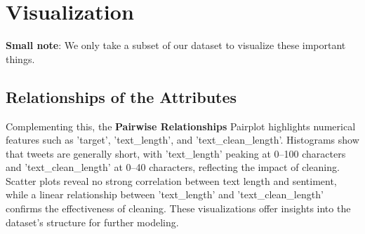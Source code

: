 \section{Visualization}

\textbf{Small note}: We only take a subset of our dataset to visualize these important things.




\subsection{Relationships of the Attributes}

Complementing this, the \textbf{Pairwise Relationships} Pairplot highlights numerical features such as 'target', 'text\_length', and 'text\_clean\_length'. Histograms show that tweets are generally short, with 'text\_length' peaking at 0–100 characters and 'text\_clean\_length' at 0–40 characters, reflecting the impact of cleaning. Scatter plots reveal no strong correlation between text length and sentiment, while a linear relationship between 'text\_length' and 'text\_clean\_length' confirms the effectiveness of cleaning. These visualizations offer insights into the dataset’s structure for further modeling.

